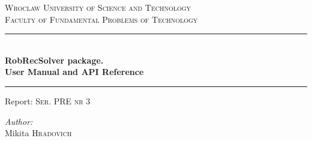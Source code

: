 \begin{titlepage}

\newcommand{\HRule}{\rule{\linewidth}{0.5mm}} %

\center %
 

\textsc{\Large Wroclaw University of Science and Technology}\\
\textsc{\large Faculty of Fundamental Problems of Technology}\\[2.5cm] %



\HRule \\[0.4cm]
{ \huge \bfseries{RobRecSolver package.\\ User Manual and API Reference}}\\[0.4cm] %
\HRule


Report: \textsc{Ser. PRE nr 3} \\[1.6cm]
 

\begin{minipage}{1.0\textwidth}
\begin{flushright} \large
\emph{Author:} \\
Mikita \textsc{Hradovich}
\end{flushright}
\end{minipage}\\[2.5cm]


\end{titlepage}
